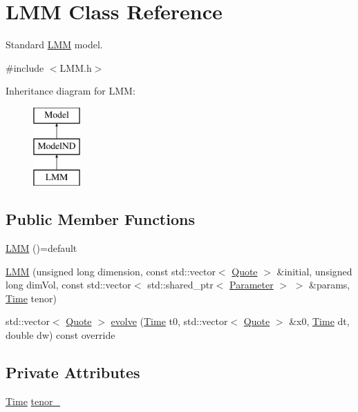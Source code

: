 \hypertarget{class_l_m_m}{}\section{L\+MM Class Reference}
\label{class_l_m_m}


Standard \hyperlink{class_l_m_m}{L\+MM} model.  




{\ttfamily \#include $<$L\+M\+M.\+h$>$}

Inheritance diagram for L\+MM\+:\begin{figure}[H]
\begin{center}
\leavevmode
\includegraphics[height=3.000000cm]{class_l_m_m}
\end{center}
\end{figure}
\subsection*{Public Member Functions}
\begin{DoxyCompactItemize}
\item 
\hyperlink{class_l_m_m_a4de26d3647b221d5d16667a402edfef2}{L\+MM} ()=default
\item 
\hyperlink{class_l_m_m_aa6d3ff98a4153869dd59c17135181a4c}{L\+MM} (unsigned long dimension, const std\+::vector$<$ \hyperlink{_name_def_8h_a642a6c5fd87319d922637de0e0bb0305}{Quote} $>$ \&initial, unsigned long dim\+Vol, const std\+::vector$<$ std\+::shared\+\_\+ptr$<$ \hyperlink{class_parameter}{Parameter} $>$ $>$ \&params, \hyperlink{_name_def_8h_ac2d3e0ba793497bcca555c7c2cf64ff3}{Time} tenor)
\item 
std\+::vector$<$ \hyperlink{_name_def_8h_a642a6c5fd87319d922637de0e0bb0305}{Quote} $>$ \hyperlink{class_l_m_m_a8dfdd340048e482a8059f473b5aacfd1}{evolve} (\hyperlink{_name_def_8h_ac2d3e0ba793497bcca555c7c2cf64ff3}{Time} t0, std\+::vector$<$ \hyperlink{_name_def_8h_a642a6c5fd87319d922637de0e0bb0305}{Quote} $>$ \&x0, \hyperlink{_name_def_8h_ac2d3e0ba793497bcca555c7c2cf64ff3}{Time} dt, double dw) const override
\end{DoxyCompactItemize}
\subsection*{Private Attributes}
\begin{DoxyCompactItemize}
\item 
\hyperlink{_name_def_8h_ac2d3e0ba793497bcca555c7c2cf64ff3}{Time} \hyperlink{class_l_m_m_a92e55b5b940238e97a668c039cc593fa}{tenor\+\_\+}
\end{DoxyCompactItemize}
